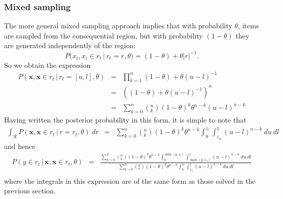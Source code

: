 \documentclass[doc]{apa6}
\newcommand{\p}{P}
\newcommand{\xn}{{\bm{x}}}
\newcommand{\rt}{{r_t}}
\newcommand{\condon}{\, | \,}
\begin{document}
\subsubsection{Mixed sampling} The more general mixed sampling approach implies that with probability $\theta$, items are sampled from the consequential region, but with probability $(1-\theta)$ they are generated independently of the region:
\begin{equation}
\p(x_i, x_i \in \rt \condon  \rt=r, \theta) = (1-\theta) + \theta |r|^{-1}.
\end{equation}
So we obtain the expression
\begin{eqnarray}
\p(\xn, \xn \in \rt \condon  \rt=[u,l], \theta) &=& \prod_{k=1}^n (1-\theta) + \theta(u-l)^{-1} \nonumber \\
&=& \left( (1-\theta) + \theta(u-l)^{-1} \right)^n \nonumber \\
&=& \sum_{k=0}^n \left(^n_k\right) (1-\theta)^k \theta^{n-k} (u-l)^{n-k}
\end{eqnarray}
Having written the posterior probability in this form, it is simple to note that
\begin{eqnarray}
\int_{\mathcal{R}} \p(\xn, \xn \in \rt\condon  r=\rt, \theta) \ dr &=& \sum_{k=0}^n \left(^n_k\right) (1-\theta)^k \theta^{n-k} \int_0^{z_l} \int_{z_u}^1 (u-l)^{n-k} \ du \ dl
\end{eqnarray}
and hence
\begin{eqnarray}
\p(y \in \rt \condon  \xn, \xn \in \rt, \theta) &=& \frac{\sum_{k=0}^n \left(^n_k\right) (1-\theta)^k \theta^{n-k} \int_0^{\min(y,z_l)} \int_{\max(y,z_u)}^1 (u-l)^{n-k} \ du \ dl}{\sum_{k=0}^n \left(^n_k\right) (1-\theta)^k \theta^{n-k} \int_0^{z_l} \int_{z_u}^1 (u-l)^{n-k} \ du \ dl} \nonumber \\ \label{bigger}
\end{eqnarray}
where the integrals in this expression are of the same form as those solved in the previous section.
\end{document}
